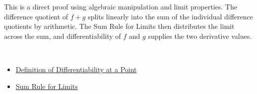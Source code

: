 \begin{remark*}
This is a direct proof using algebraic manipulation and limit properties. The difference quotient of $f + g$ splits linearly into the sum of the individual difference quotients by arithmetic. The Sum Rule for Limits then distributes the limit across the sum, and differentiability of $f$ and $g$ supplies the two derivative values.
\end{remark*}

\begin{remark*}[Dependencies]~\\
\begin{itemize}
  \item \hyperref[def:derivative-at-point]{Definition of Differentiability at a Point}
  \item \hyperref[thm:limit-sum]{Sum Rule for Limits}
\end{itemize}
\end{remark*}